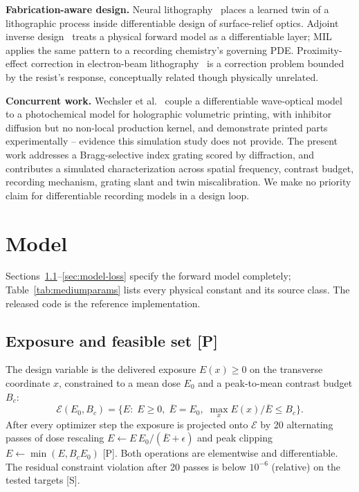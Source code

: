 \documentclass{optica-article}
\begin{document}
\textbf{Fabrication-aware design.} Neural lithography~\cite{zheng2023neural}
places a learned twin of a lithographic process inside differentiable
design of surface-relief optics. Adjoint inverse design~\cite{hughes2018adjoint}
treats a physical forward model as a differentiable layer; MIL applies the
same pattern to a recording chemistry's governing PDE. Proximity-effect
correction in electron-beam lithography~\cite{li2015proximity} is a
correction problem bounded by the resist's response, conceptually related
though physically unrelated.

\textbf{Concurrent work.} Wechsler et al.~\cite{wechsler2026shvam} couple a
differentiable wave-optical model to a photochemical model for holographic
volumetric printing, with inhibitor diffusion but no non-local production
kernel, and demonstrate printed parts experimentally -- evidence this
simulation study does not provide. The present work addresses a
Bragg-selective index grating scored by diffraction, and contributes a
simulated characterization across spatial frequency, contrast budget,
recording mechanism, grating slant and twin miscalibration. We make no
priority claim for differentiable recording models in a design loop.

\section{Model}
\label{sec:model}
Sections~\ref{sec:model-exposure}--\ref{sec:model-loss} specify the forward
model completely; Table~\ref{tab:mediumparams} lists every physical
constant and its source class. The released code is the reference
implementation.

\subsection{Exposure and feasible set [P]}
\label{sec:model-exposure}
The design variable is the delivered exposure $E(x)\ge 0$ on the transverse
coordinate $x$, constrained to a mean dose $E_0$ and a peak-to-mean
contrast budget $B_c$:
\begin{equation}
\label{eq:feasible-set}
\mathcal{E}(E_0,B_c)=\Big\{E:\;E\ge0,\;\overline{E}=E_0,\;
\max_x E(x)/\overline{E}\le B_c\Big\}.
\end{equation}
After every optimizer step the exposure is projected onto $\mathcal{E}$ by
20 alternating passes of dose rescaling $E\leftarrow E\,E_0/(\overline{E}+\epsilon)$
and peak clipping $E\leftarrow\min(E,B_cE_0)$ [P]. Both operations are
elementwise and differentiable. The residual constraint violation after
20 passes is below $10^{-6}$ (relative) on the tested targets [S].
\end{document}
